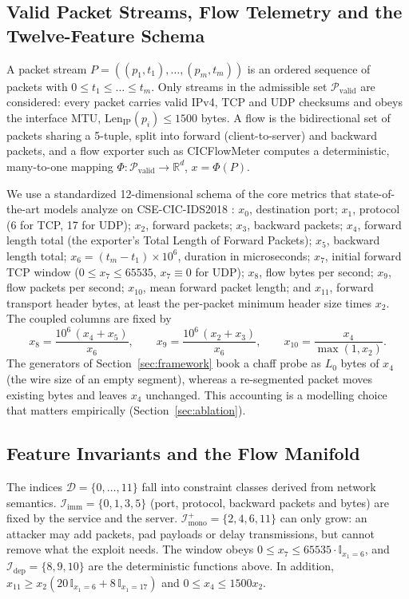 \subsection{Valid Packet Streams, Flow Telemetry and the Twelve-Feature Schema}
\label{sec:formulation}
A packet stream $P=((p_1,t_1),\dots,(p_m,t_m))$ is an ordered sequence of packets with $0\le t_1\le\dots\le t_m$. Only streams in the admissible set $\mathcal{P}_{\text{valid}}$ are considered: every packet carries valid IPv4, TCP and UDP checksums \cite{rfc791,rfc9293,rfc768} and obeys the interface MTU, $\text{Len}_{\text{IP}}(p_i)\le 1500$ bytes. A flow is the bidirectional set of packets sharing a 5-tuple, split into forward (client-to-server) and backward packets, and a flow exporter such as CICFlowMeter \cite{sharafaldin2018toward} computes a deterministic, many-to-one mapping $\Phi:\mathcal{P}_{\text{valid}}\to\mathbb{R}^d$, $x=\Phi(P)$.

We use a standardized 12-dimensional schema of the core metrics that state-of-the-art models analyze on CSE-CIC-IDS2018 \cite{sharafaldin2018toward}: $x_0$, destination port; $x_1$, protocol (6 for TCP, 17 for UDP); $x_2$, forward packets; $x_3$, backward packets; $x_4$, forward length total (the exporter's Total Length of Forward Packets); $x_5$, backward length total; $x_6=(t_m-t_1)\times 10^6$, duration in microseconds; $x_7$, initial forward TCP window ($0\le x_7\le 65535$, $x_7\equiv 0$ for UDP); $x_8$, flow bytes per second; $x_9$, flow packets per second; $x_{10}$, mean forward packet length; and $x_{11}$, forward transport header bytes, at least the per-packet minimum header size times $x_2$. The coupled columns are fixed by
\begin{equation}
    x_8=\frac{10^6\,(x_4+x_5)}{x_6},\qquad x_9=\frac{10^6\,(x_2+x_3)}{x_6},\qquad x_{10}=\frac{x_4}{\max(1,x_2)}.
\end{equation}
The generators of Section~\ref{sec:framework} book a chaff probe as $L_0$ bytes of $x_4$ (the wire size of an empty segment), whereas a re-segmented packet moves existing bytes and leaves $x_4$ unchanged. This accounting is a modelling choice that matters empirically (Section~\ref{sec:ablation}).

\subsection{Feature Invariants and the Flow Manifold}
The indices $\mathcal{D}=\{0,\dots,11\}$ fall into constraint classes derived from network semantics. $\mathcal{I}_{\text{imm}}=\{0,1,3,5\}$ (port, protocol, backward packets and bytes) are fixed by the service and the server. $\mathcal{I}_{\text{mono}}^+=\{2,4,6,11\}$ can only grow: an attacker may add packets, pad payloads or delay transmissions, but cannot remove what the exploit needs. The window obeys $0\le x_7\le 65535\cdot\mathbb{I}_{x_1=6}$, and $\mathcal{I}_{\text{dep}}=\{8,9,10\}$ are the deterministic functions above. In addition, $x_{11}\ge x_2(20\,\mathbb{I}_{x_1=6}+8\,\mathbb{I}_{x_1=17})$ and $0\le x_4\le 1500x_2$.

